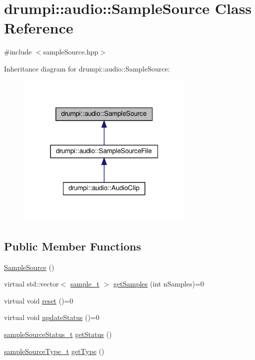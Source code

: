 \hypertarget{classdrumpi_1_1audio_1_1SampleSource}{}\section{drumpi\+:\+:audio\+:\+:Sample\+Source Class Reference}
\label{classdrumpi_1_1audio_1_1SampleSource}


{\ttfamily \#include $<$sample\+Source.\+hpp$>$}



Inheritance diagram for drumpi\+:\+:audio\+:\+:Sample\+Source\+:
\nopagebreak
\begin{figure}[H]
\begin{center}
\leavevmode
\includegraphics[width=241pt]{classdrumpi_1_1audio_1_1SampleSource__inherit__graph}
\end{center}
\end{figure}
\subsection*{Public Member Functions}
\begin{DoxyCompactItemize}
\item 
\hyperlink{classdrumpi_1_1audio_1_1SampleSource_a8c83ab0aa33861c5f88783b3a818ffba}{Sample\+Source} ()
\item 
virtual std\+::vector$<$ \hyperlink{namespacedrumpi_1_1audio_aca0bdc9164f87b72057e284442abab6e}{sample\+\_\+t} $>$ \hyperlink{classdrumpi_1_1audio_1_1SampleSource_ab3f12884325b818ebe088dec5daa15cd}{get\+Samples} (int n\+Samples)=0
\item 
virtual void \hyperlink{classdrumpi_1_1audio_1_1SampleSource_aa7b214c99ee55ceac758fdef44b0cd6d}{reset} ()=0
\item 
virtual void \hyperlink{classdrumpi_1_1audio_1_1SampleSource_aff9beb7031bc5af424dccc525be5e9d3}{update\+Status} ()=0
\item 
\hyperlink{namespacedrumpi_1_1audio_a51bdf5757f414341f104d45e75e2bf63}{sample\+Source\+Status\+\_\+t} \hyperlink{classdrumpi_1_1audio_1_1SampleSource_a9fea9c824e15d891cbacbf4c5187c2aa}{get\+Status} ()
\item 
\hyperlink{namespacedrumpi_1_1audio_a997f55e8a5b5348cf74dbedb7abe8a59}{sample\+Source\+Type\+\_\+t} \hyperlink{classdrumpi_1_1audio_1_1SampleSource_a83b000d9fe8335788f4ba876b13b4b66}{get\+Type} ()
\end{DoxyCompactItemize}
